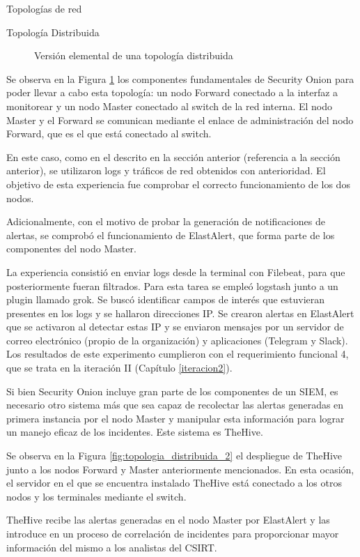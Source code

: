 \begin{section}{Topologías de red }
\begin{subsection} {Topología Distribuida}
\begin{figure}[h]
                \caption{Versión elemental de una topología distribuida}
                \label{fig:topologia_distribuida_1}
            \end{figure}
            \FloatBarrier
            Se observa en la Figura \ref{fig:topologia_distribuida_1} los componentes fundamentales de Security Onion para poder llevar a cabo esta topología: un nodo Forward conectado a la interfaz a monitorear y un nodo Master conectado al switch de la red interna. El nodo Master y el Forward se comunican mediante el enlace de administración del nodo Forward, que es el que está conectado al switch. \par
            En este caso, como en el descrito en la sección anterior (referencia a la sección anterior), se utilizaron logs y tráficos de red obtenidos con anterioridad. El objetivo de esta experiencia fue comprobar el correcto funcionamiento de los dos nodos. \par
            Adicionalmente, con el motivo de probar la generación de notificaciones de alertas, se comprobó el funcionamiento de ElastAlert, que forma parte de los componentes del nodo Master. \par
            La experiencia consistió en enviar logs desde la terminal con Filebeat, para que posteriormente fueran filtrados. Para esta tarea se empleó logstash junto a un plugin llamado grok. Se buscó identificar campos de interés que estuvieran presentes en los logs y se hallaron direcciones IP. Se crearon alertas en ElastAlert que se activaron al detectar estas IP y se enviaron mensajes por un servidor de correo electrónico (propio de la organización) y aplicaciones (Telegram y Slack). Los resultados de este experimento cumplieron con el requerimiento funcional 4, que se trata en la iteración II (Capítulo \ref{iteracion2}).\par
            Si bien Security Onion incluye gran parte de los componentes de un SIEM, es necesario otro sistema más que sea capaz de recolectar las alertas generadas en primera instancia por el nodo Master y manipular esta información para lograr un manejo eficaz de los incidentes. Este sistema es TheHive. \par
            Se observa en la Figura \ref{fig:topologia_distribuida_2} el despliegue de TheHive junto a los nodos Forward y Master anteriormente mencionados. En esta ocasión, el servidor en el que se encuentra instalado TheHive está conectado a los otros nodos y los terminales mediante el switch.\par
            TheHive recibe las alertas generadas en el nodo Master por ElastAlert y las introduce en un proceso de correlación de incidentes para proporcionar mayor información del mismo a los analistas del CSIRT. \par

\end{subsection}
\end{section}
